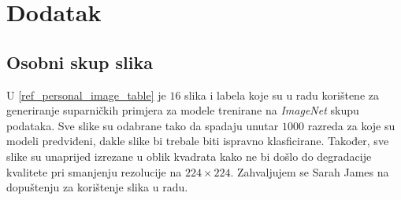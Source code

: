\documentclass[utf8, diplomski]{fer}
\begin{document}
\chapter{Dodatak}
\section{Osobni skup slika}
U \ref{ref_personal_image_table} je $16$ slika i labela koje su u radu korištene za generiranje suparničkih primjera za modele trenirane na \textit{ImageNet} skupu podataka. Sve slike su odabrane tako da spadaju unutar $1000$ razreda za koje su modeli predviđeni, dakle slike bi trebale biti ispravno klasficirane. Također, sve slike su unaprijed izrezane u oblik kvadrata kako ne bi došlo do degradacije kvalitete pri smanjenju rezolucije na $224\times224$. Zahvaljujem se Sarah James na dopuštenju za korištenje slika u radu.
\end{document}
